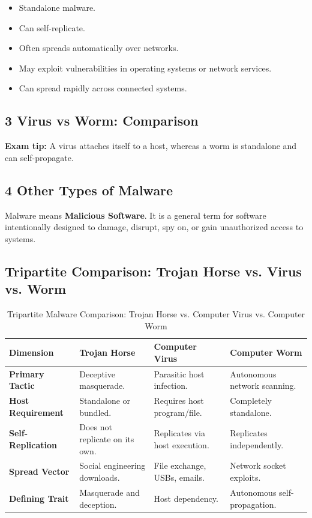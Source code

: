 \begin{itemize}
\item Standalone malware.
\item Can self-replicate.
\item Often spreads automatically over networks.
\item May exploit vulnerabilities in operating systems or network services.
\item Can spread rapidly across connected systems.
\end{itemize}

\subsection{3 Virus vs Worm: Comparison}


\textbf{Exam tip:} A virus attaches itself to a host, whereas a worm is standalone and can self-propagate.

\subsection{4 Other Types of Malware}

Malware means \textbf{Malicious Software}. It is a general term for software intentionally designed to damage, disrupt, spy on, or gain unauthorized access to systems.


\subsection{Tripartite Comparison: Trojan Horse vs. Virus vs. Worm}

\begin{table}[htbp]
\centering
\caption{Tripartite Malware Comparison: Trojan Horse vs. Computer Virus vs. Computer Worm}
\label{tab:trojan_vs_virus_vs_worm}
\begin{tabularx}{\textwidth}{p{3.0cm} p{3.8cm} p{3.8cm} X}
\toprule
\textbf{Dimension} & \textbf{Trojan Horse} & \textbf{Computer Virus} & \textbf{Computer Worm} \\
\midrule
\textbf{Primary Tactic} & Deceptive masquerade. & Parasitic host infection. & Autonomous network scanning. \\
\textbf{Host Requirement} & Standalone or bundled. & Requires host program/file. & Completely standalone. \\
\textbf{Self-Replication} & Does not replicate on its own. & Replicates via host execution. & Replicates independently. \\
\textbf{Spread Vector} & Social engineering downloads. & File exchange, USBs, emails. & Network socket exploits. \\
\textbf{Defining Trait} & Masquerade and deception. & Host dependency. & Autonomous self-propagation. \\
\bottomrule
\end{tabularx}
\end{table}



